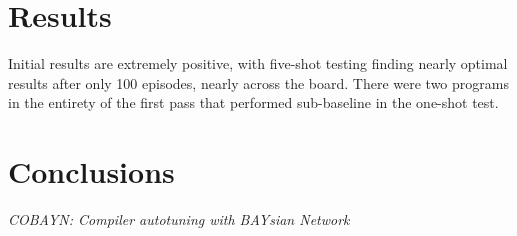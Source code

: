 \documentclass{article}
\begin{document}
\section{Results}
Initial results are extremely positive, with five-shot testing finding nearly optimal results after only 100 episodes, nearly across the board. There were two programs in the entirety of the first pass that performed sub-baseline in the one-shot test.

\section{Conclusions}



\begin{thebibliography}{9}
 \emph{COBAYN: Compiler autotuning with BAYsian Network}
\end{thebibliography}
\end{document}
